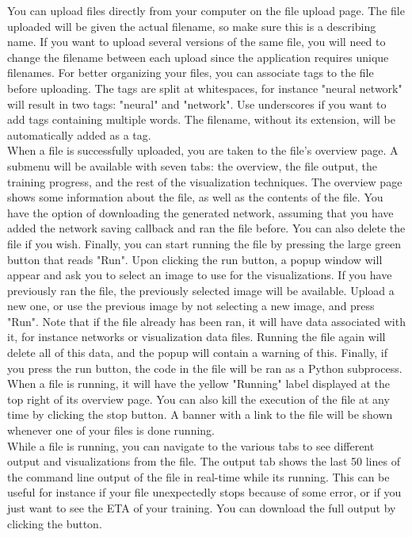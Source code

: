 
\noindent You can upload files directly from your computer on the file upload page. The file uploaded will be given the actual filename, so make sure this is a describing name. If you want to upload several versions of the same file, you will need to change the filename between each upload since the application requires unique filenames. For better organizing your files, you can associate tags to the file before uploading. The tags are split at whitespaces, for instance "neural network" will result in two tags: "neural" and "network". Use underscores if you want to add tags containing multiple words. The filename, without its extension, will be automatically added as a tag. \\


\noindent When a file is successfully uploaded, you are taken to the file's overview page. A submenu will be available with seven tabs: the overview, the file output, the training progress, and the rest of the visualization techniques. The overview page shows some information about the file, as well as the contents of the file. You have the option of downloading the generated network, assuming that you have added the network saving callback and ran the file before. You can also delete the file if you wish. Finally, you can start running the file by pressing the large green button that reads "Run". Upon clicking the run button, a popup window will appear and ask you to select an image to use for the visualizations. If you have previously ran the file, the previously selected image will be available. Upload a new one, or use the previous image by not selecting a new image, and press "Run". Note that if the file already has been ran, it will have data associated with it, for instance networks or visualization data files. Running the file again will delete all of this data, and the popup will contain a warning of this. Finally, if you press the run button, the code in the file will be ran as a Python subprocess. When a file is running, it will have the yellow "Running" label displayed at the top right of its overview page. You can also kill the execution of the file at any time by clicking the stop button. A banner with a link to the file will be shown whenever one of your files is done running.\\


\noindent While a file is running, you can navigate to the various tabs to see different output and visualizations from the file. The output tab shows the last 50 lines of the command line output of the file in real-time while its running. This can be useful for instance if your file unexpectedly stops because of some error, or if you just want to see the ETA of your training. You can download the full output by clicking the button. \\

